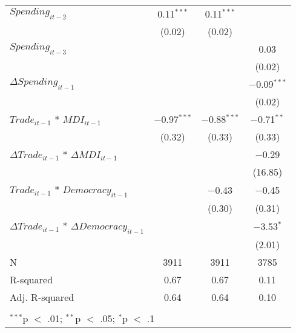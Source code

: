 \begin{table}[!htbp]
\begin{tabular}{@{\extracolsep{5pt}}lccc}
  $Spending_{it-2}$ & 0.11$^{***}$ & 0.11$^{***}$ &  \\ 
  & (0.02) & (0.02) &  \\ 
  $Spending_{it-3}$ &  &  & 0.03 \\ 
  &  &  & (0.02) \\ 
  $\Delta Spending_{it-1}$ &  &  & $-$0.09$^{***}$ \\ 
  &  &  & (0.02) \\ 
  $Trade_{it-1}$ * $MDI_{it-1}$ & $-$0.97$^{***}$ & $-$0.88$^{***}$ & $-$0.71$^{**}$ \\ 
  & (0.32) & (0.33) & (0.33) \\ 
  $\Delta Trade_{it-1}$ * $\Delta MDI_{it-1}$ &  &  & $-$0.29 \\ 
  &  &  & (16.85) \\ 
  $Trade_{it-1}$ * $Democracy_{it-1}$ &  & $-$0.43 & $-$0.45 \\ 
  &  & (0.30) & (0.31) \\ 
  $\Delta Trade_{it-1}$ * $\Delta Democracy_{it-1}$ &  &  & $-$3.53$^{*}$ \\ 
  &  &  & (2.01) \\ 
 N & 3911 & 3911 & 3785 \\ 
R-squared & 0.67 & 0.67 & 0.11 \\ 
Adj. R-squared & 0.64 & 0.64 & 0.10 \\ 
\hline \\[-1.8ex] 
\multicolumn{4}{l}{$^{***}$p $<$ .01; $^{**}$p $<$ .05; $^{*}$p $<$ .1} \\ 
\end{tabular} 
\end{table} 
